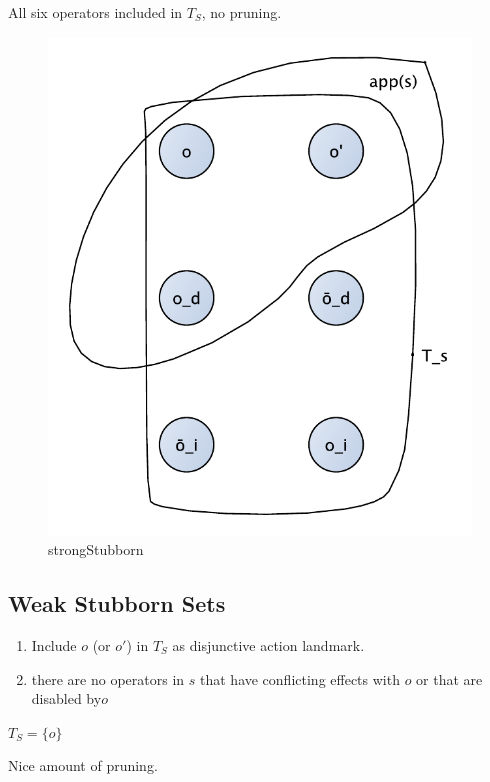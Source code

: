 \documentclass[11pt,a4paper]{article}
\begin{document}
All six operators included in $T_S$, no pruning.

\begin{figure}[h!]
\centering
\includegraphics[scale=0.4]{strongStubborn}
\caption{strongStubborn}
\end{figure}

\subsection*{Weak Stubborn Sets}
\begin{enumerate}
\item Include $o$ (or $o'$) in $T_S$ as disjunctive action landmark.
\item there are no operators in $s$ that have conflicting effects with $o$ or that are disabled by$o$
\end{enumerate}
$T_S = \{o\} $

Nice amount of pruning.
\end{document}
